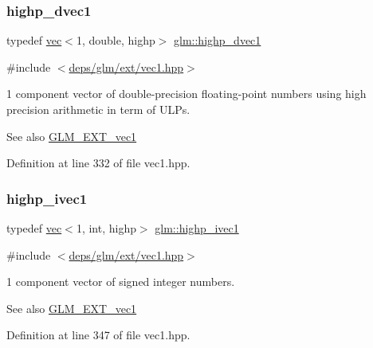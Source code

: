 \subsubsection{\texorpdfstring{highp\+\_\+dvec1}{highp\_dvec1}}
{\footnotesize\ttfamily typedef \hyperlink{structglm_1_1vec}{vec}$<$1, double, highp$>$ \hyperlink{group__ext__vec1_ga51e54e6b2fe3962fc44a176eeb3e3fe6}{glm\+::highp\+\_\+dvec1}}



{\ttfamily \#include $<$\hyperlink{ext_2vec1_8hpp}{deps/glm/ext/vec1.\+hpp}$>$}

1 component vector of double-\/precision floating-\/point numbers using high precision arithmetic in term of U\+L\+Ps.

\begin{DoxySeeAlso}{See also}
\hyperlink{group__ext__vec1}{G\+L\+M\+\_\+\+E\+X\+T\+\_\+vec1} 
\end{DoxySeeAlso}


Definition at line 332 of file vec1.\+hpp.

\mbox{\label{group__ext__vec1_gac44dcd92c25ab0d3f5c514137d5460d8}} 
\subsubsection{\texorpdfstring{highp\+\_\+ivec1}{highp\_ivec1}}
{\footnotesize\ttfamily typedef \hyperlink{structglm_1_1vec}{vec}$<$1, int, highp$>$ \hyperlink{group__ext__vec1_gac44dcd92c25ab0d3f5c514137d5460d8}{glm\+::highp\+\_\+ivec1}}



{\ttfamily \#include $<$\hyperlink{ext_2vec1_8hpp}{deps/glm/ext/vec1.\+hpp}$>$}

1 component vector of signed integer numbers.

\begin{DoxySeeAlso}{See also}
\hyperlink{group__ext__vec1}{G\+L\+M\+\_\+\+E\+X\+T\+\_\+vec1} 
\end{DoxySeeAlso}


Definition at line 347 of file vec1.\+hpp.

\mbox{\label{group__ext__vec1_ga4e92a1105fa908e8a96971602381e381}} 
